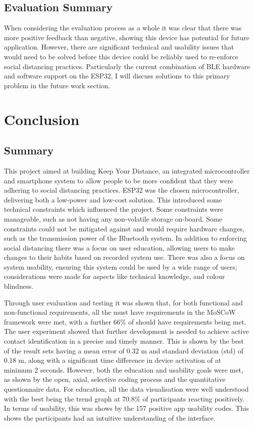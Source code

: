 \documentclass{l4proj}
\begin{document}
\section{Evaluation Summary}

When considering the evaluation process as a whole it was clear that there was more positive feedback than negative, showing this device has potential for future application. However, there are significant technical and usability issues that would need to be solved before this device could be reliably used to re-enforce social distancing practices. Particularly the current combination of BLE hardware and software support on the ESP32, I will discuss solutions to this primary problem in the future work section.

\chapter{Conclusion}

\section{Summary}

This project aimed at building Keep Your Distance, an integrated microcontroller and smartphone system to allow people to be more confident that they were adhering to social distancing practices. ESP32 was the chosen microcontroller, delivering both a low-power and low-cost solution. This introduced some technical constraints which influenced the project. Some constraints were manageable, such as not having any non-volatile storage on-board. Some constraints could not be mitigated against and would require hardware changes, such as the transmission power of the Bluetooth system. In addition to enforcing social distancing there was a focus on user education, allowing users to make changes to their habits based on recorded system use. There was also a focus on system usability, ensuring this system could be used by a wide range of users; considerations were made for aspects like technical knowledge, and colour blindness.

Through user evaluation and testing it was shown that, for both functional and non-functional requirements, all the must have requirements in the MoSCoW framework were met, with a further 66\% of should have requirements being met. The user experiment showed that further development is needed to achieve active contact identification in a precise and timely manner. This is shown by the best of the result sets having a mean error of 0.32 m and standard deviation (std) of 0.18 m, along with a significant time difference in device activation of at minimum 2 seconds. However, both the education and usability goals were met, as shown by the open, axial, selective coding process and the quantitative questionnaire data. For education, all the data visualisation were well understood with the best being the trend graph at 70.8\% of participants reacting positively. In terms of usability, this was shows by the 157 positive app usability codes. This shows the participants had an intuitive understanding of the interface.
\end{document}

